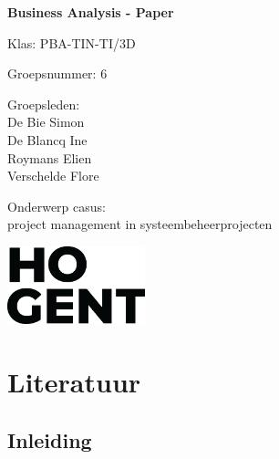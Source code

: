 \documentclass{article}
\begin{document}
    
    \begin{titlepage}
        \centering
        \vspace*{2cm}
        
        {\Huge \textbf{Business Analysis - Paper}}\\
        \vspace{1.5cm}
        
        {\Large Klas:  PBA-TIN-TI/3D}\\
        \vspace{0.5cm}
        
        {\Large Groepsnummer: 6}\\
        \vspace{0.5cm}
        
        {\Large Groepsleden: \\
            De Bie Simon\\
            De Blancq Ine\\
            Roymans Elien\\[0.15cm]
            Verschelde Flore}\\
        \vspace{1.0cm}
        
        {\Large Onderwerp casus:\\ project management in systeembeheerprojecten}\\
        
        \vfill
        
        \begin{flushright}
            \includegraphics[width=0.3\textwidth]{logo.png}
        \end{flushright}
    \end{titlepage}

    \tableofcontents
    \newpage

    \setcounter{page}{1}

    \section{Literatuur}
    \subsection{Inleiding}
\end{document}
